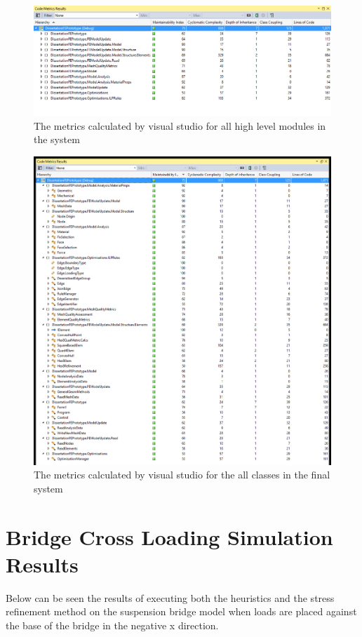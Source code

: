 \begin{figure}[!h]
  \centerline{\includegraphics[width=165mm, scale=0.5]{../Graphics/softwareQualityMetrics.png}}
  \caption{The metrics calculated by visual studio for all high level modules in the system}
\end{figure}

\begin{figure}[!h]
  \centerline{\includegraphics[width=165mm, scale=0.5]{../Graphics/qualityMetricsExpanded.png}}
  \caption{The metrics calculated by visual studio for the all classes in the final system}
\end{figure}
%


\section{Bridge Cross Loading Simulation Results}
Below can be seen the results of executing both the heuristics and the stress refinement method on the suspension bridge model when loads are placed against the base of the bridge in the negative x direction.

